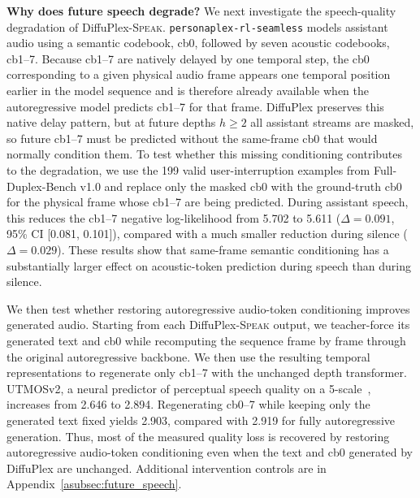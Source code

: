 \textbf{Why does future speech degrade?}
We next investigate the speech-quality degradation of DiffuPlex-\textsc{Speak}.
\texttt{personaplex-rl-seamless} models assistant audio using a semantic codebook, cb0, followed by seven acoustic codebooks, cb1--7.
Because cb1--7 are natively delayed by one temporal step, the cb0 corresponding to a given physical audio frame appears one temporal position earlier in the model sequence and is therefore already available when the autoregressive model predicts cb1--7 for that frame.
DiffuPlex preserves this native delay pattern, but at future depths $h\geq2$ all assistant streams are masked, so future cb1--7 must be predicted without the same-frame cb0 that would normally condition them.
To test whether this missing conditioning contributes to the degradation, we use the 199 valid user-interruption examples from Full-Duplex-Bench v1.0 and replace only the masked cb0 with the ground-truth cb0 for the physical frame whose cb1--7 are being predicted.
During assistant speech, this reduces the cb1--7 negative log-likelihood from 5.702 to 5.611
($\Delta=0.091$, 95\% CI [0.081, 0.101]), compared with a much smaller reduction during silence ($\Delta=0.029$).
These results show that same-frame semantic conditioning has a substantially larger effect on acoustic-token prediction during speech than during silence.

We then test whether restoring autoregressive audio-token conditioning improves generated audio.
Starting from each DiffuPlex-\textsc{Speak} output, we teacher-force its generated text and cb0 while recomputing the sequence frame by frame through the original autoregressive backbone.
We then use the resulting temporal representations to regenerate only cb1--7 with the unchanged depth transformer.
UTMOSv2, a neural predictor of perceptual speech quality on a 5-scale~\citep{10832315}, increases from 2.646 to 2.894.
Regenerating cb0--7 while keeping only the generated text fixed yields 2.903, compared with 2.919 for fully autoregressive generation.
Thus, most of the measured quality loss is recovered by restoring autoregressive audio-token conditioning even when the text and cb0 generated by DiffuPlex are unchanged.
Additional intervention controls are in
Appendix~\ref{asubsec:future_speech}.
